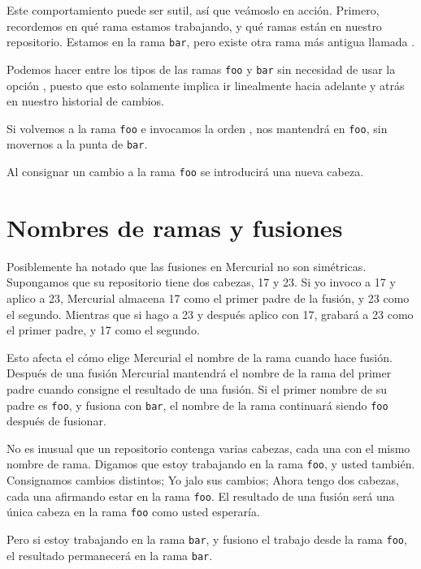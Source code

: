Este comportamiento puede ser sutil, así que veámoslo en acción.  Primero,
recordemos en qué rama estamos trabajando, y qué ramas están en
nuestro repositorio.
Estamos en la rama \texttt{bar}, pero existe otra rama más antigua
llamada .

Podemos hacer  entre los tipos de las ramas \texttt{foo}
y \texttt{bar} sin necesidad de usar la opción ,
puesto que esto solamente implica ir linealmente hacia adelante y
atrás en nuestro historial de cambios.

Si volvemos a la rama \texttt{foo} e invocamos la orden ,
nos mantendrá en \texttt{foo}, sin movernos a la punta de \texttt{bar}.

Al consignar un cambio a la rama \texttt{foo} se introducirá una nueva
cabeza.

\section{Nombres de ramas y fusiones}

Posiblemente ha notado que las fusiones en Mercurial no son simétricas.
Supongamos que su repositorio tiene dos cabezas, 17 y 23.  Si yo invoco
 a 17 y aplico  a 23, Mercurial almacena 17
como el primer padre de la fusión, y 23 como el segundo. Mientras que
si hago  a 23 y después aplico  con 17,
grabará a 23 como el primer padre, y 17 como el segundo.

Esto afecta el cómo elige Mercurial el nombre de la rama cuando hace
fusión.  Después de una fusión Mercurial mantendrá el nombre de la
rama del primer padre cuando consigne el resultado de una fusión.  Si
el primer nombre de su padre es \texttt{foo}, y fusiona con
\texttt{bar}, el nombre de la rama continuará siendo \texttt{foo}
después de fusionar.

No es inusual que un repositorio contenga varias cabezas, cada una con
el mismo nombre de rama.  Digamos que estoy trabajando en la rama
\texttt{foo}, y usted también.  Consignamos cambios distintos; Yo jalo
sus cambios; Ahora tengo dos cabezas, cada una afirmando estar en la
rama \texttt{foo}.  El resultado de una fusión será una única cabeza
en la rama \texttt{foo} como usted esperaría.

Pero si estoy trabajando en la rama \texttt{bar}, y fusiono el trabajo
desde la rama \texttt{foo}, el resultado permanecerá en la rama
\texttt{bar}.

